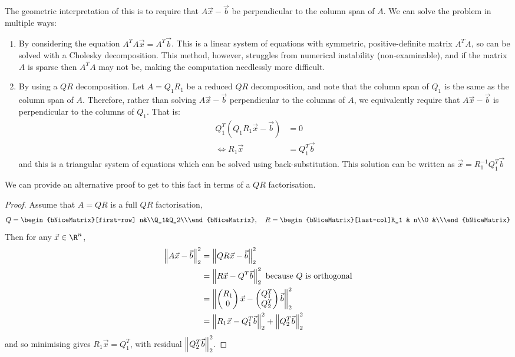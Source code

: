 \documentclass[../Main.tex]{subfiles}
\begin{document}
The geometric interpretation of this is to require that $A\vec{x} - \vec{b}$ be perpendicular to the column span of $A$. We can solve the problem in multiple ways:
\begin{enumerate}
    \item By considering the equation $A^TA\vec{x} = A^T\vec{b}$. This is a linear system of equations with symmetric, positive-definite matrix $A^TA$, so can be solved with a Cholesky decomposition. This method, however, struggles from numerical instability (non-examinable), and if the matrix $A$ is sparse then $A^TA$ may not be, making the computation needlessly more difficult.
    \item By using a $QR$ decomposition. Let $A = Q_1 R_1$ be a reduced $QR$ decomposition, and note that the column span of $Q_1$ is the same as the column span of $A$. Therefore, rather than solving $A\vec{x} - \vec{b}$ perpendicular to the columns of $A$, we equivalently require that $A\vec{x} - \vec{b}$ is perpendicular to the columns of $Q_1$. That is:
        \begin{align*}
            Q_1^T(Q_1R_1\vec{x} - \vec{b}) &= 0 \\
            \iff R_1\vec{x} &= Q_1^T\vec{b}
        \end{align*}
        and this is a triangular system of equations which can be solved using back-substitution. This solution can be written as $\vec{x} = R_1^{-1} Q_1^T\vec{b}$
\end{enumerate}
We can provide an alternative proof to get to this fact in terms of a $QR$ factorisation. %
\begin{proof}
    Assume that $A = QR$ is a full $QR$ factorisation,
    \begin{equation*}
        Q = \begin{bNiceMatrix}[first-row] n&\\Q_1&Q_2\\\end{bNiceMatrix},\quad R = \begin{bNiceMatrix}[last-col]R_1 & n\\0 &\\\end{bNiceMatrix}
    \end{equation*}
    Then for any $\vec{x} \in \R^n$,
    \begin{align*}
        \left\|A\vec{x}-\vec{b}\right\|_2^2 &= \left\|QR\vec{x} - \vec{b}\right\|_2^2 \\
        &= \left\|R\vec{x} - Q^T\vec{b}\right\|_2^2 \text{ because $Q$ is orthogonal} \\
        &= \left\|\begin{pmatrix}R_1\\0\end{pmatrix}\vec{x} - \begin{pmatrix}Q_1^T \\ Q_2^T\end{pmatrix}\vec{b}\right\|_2^2 \\
        &= \left\|R_1\vec{x} - Q_1^T\vec{b}\right\|_2^2 + \left\|Q_2^T\vec{b}\right\|_2^2
    \end{align*}
    and so minimising gives $R_1\vec{x} = Q_1^T$, with residual $\left\|Q_2^T\vec{b}\right\|_2^2$.
\end{proof}
\end{document}
